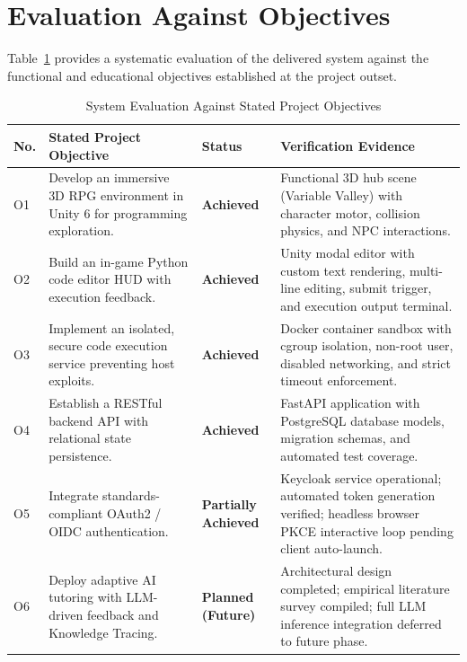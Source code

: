 \section{Evaluation Against Objectives}
Table~\ref{tab:objective_eval} provides a systematic evaluation of the delivered system against the functional and educational objectives established at the project outset.

\begin{table}[htbp]
\centering
\caption{System Evaluation Against Stated Project Objectives}
\label{tab:objective_eval}
\small
\begin{tabularx}{\textwidth}{p{}p{}p{}X}
\toprule
\textbf{No.} & \textbf{Stated Project Objective} & \textbf{Status} & \textbf{Verification Evidence} \\
\midrule
O1 & Develop an immersive 3D RPG environment in Unity 6 for programming exploration. & \textbf{Achieved} & Functional 3D hub scene (Variable Valley) with character motor, collision physics, and NPC interactions. \\
\midrule
O2 & Build an in-game Python code editor HUD with execution feedback. & \textbf{Achieved} & Unity modal editor with custom text rendering, multi-line editing, submit trigger, and execution output terminal. \\
\midrule
O3 & Implement an isolated, secure code execution service preventing host exploits. & \textbf{Achieved} & Docker container sandbox with cgroup isolation, non-root user, disabled networking, and strict timeout enforcement. \\
\midrule
O4 & Establish a RESTful backend API with relational state persistence. & \textbf{Achieved} & FastAPI application with PostgreSQL database models, migration schemas, and automated test coverage. \\
\midrule
O5 & Integrate standards-compliant OAuth2 / OIDC authentication. & \textbf{Partially Achieved} & Keycloak service operational; automated token generation verified; headless browser PKCE interactive loop pending client auto-launch. \\
\midrule
O6 & Deploy adaptive AI tutoring with LLM-driven feedback and Knowledge Tracing. & \textbf{Planned (Future)} & Architectural design completed; empirical literature survey compiled; full LLM inference integration deferred to future phase. \\
\bottomrule
\end{tabularx}
\end{table}

